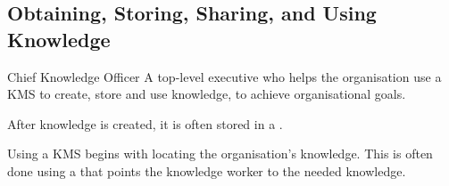 \documentclass[\main/notes.tex]{subfiles}
\begin{document}
			\subsection{Obtaining, Storing, Sharing, and Using Knowledge}
				\begin{definition}{Chief Knowledge Officer}
					A top-level executive who helps the organisation use a KMS to create, store and use knowledge, to achieve organisational goals.
				\end{definition}
				After knowledge is created, it is often stored in a .

				Using a KMS begins with locating the organisation's knowledge. This is often done using a  that points the knowledge worker to the needed knowledge.
	\vbox{}
\end{document}
